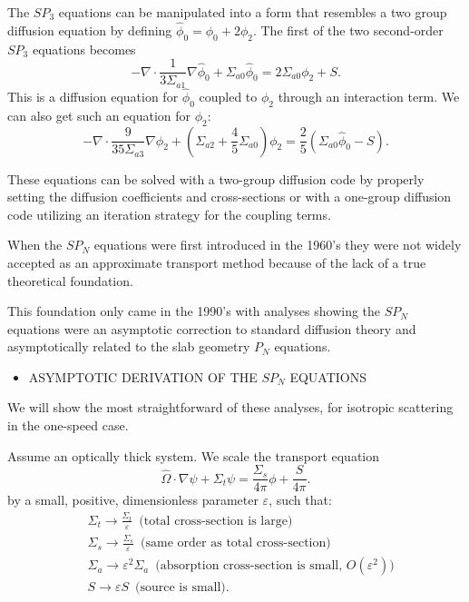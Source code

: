 \documentclass[12pt]{article}
\newcommand{\omvec}{\ensuremath{\hat{\Omega}}}
\newcommand{\ep}{\ensuremath{\varepsilon}}
\begin{document}
\begin{itemize}
The $SP_3$ equations can be manipulated into a form that resembles
a two group diffusion equation by defining $\hat\phi_0 = \phi_0+2\phi_2$. The first of the two second-order $SP_3$ equations becomes
\[
-\nabla\cdot\frac{1}{3\Sigma_{a1}}\nabla\hat\phi_0 + \Sigma_{a0}\hat\phi_0 = 2\Sigma_{a0}\phi_2+S.
\]
This is a diffusion equation for $\hat\phi_0$ coupled to $\phi_2$ through an interaction term. We can also get such an equation for $\phi_2$:
\[
-\nabla\cdot\frac{9}{35\Sigma_{a3}}\nabla\phi_2+\left(\Sigma_{a2}+\frac{4}{5}\Sigma_{a0}\right)\phi_2 = \frac{2}{5}(\Sigma_{a0}\hat\phi_0-S).
\]

These equations can be solved with a two-group diffusion code
by properly setting the diffusion coefficients and cross-sections or
with a one-group diffusion code utilizing an iteration strategy for
the coupling terms.
\end{itemize}

When the $SP_N$ equations were first introduced in the 1960's they were not widely accepted as an approximate
transport method because of the lack of a true theoretical
foundation.

This foundation only came in the 1990's with analyses showing the $SP_N$ equations were an asymptotic correction to standard diffusion theory
and asymptotically related to the slab geometry $P_N$ equations.

\begin{itemize}
\item ASYMPTOTIC DERIVATION OF THE $SP_N$ EQUATIONS
\end{itemize}
We will show the most straightforward of these analyses, for isotropic scattering in the one-speed case.

Assume an optically thick system. We scale the transport equation
\[
\omvec\cdot\nabla\psi +\Sigma_t\psi=\frac{\Sigma_s}{4\pi}\phi + \frac{S}{4\pi}.
\]
by
a small, positive, dimensionless parameter $\ep$, such that:
\[
\begin{split}
&\Sigma_t \rightarrow \frac{\Sigma_t}{\ep} \,\,\, \text{(total cross-section is large)}\\
&\Sigma_s \rightarrow \frac{\Sigma_s}{\ep} \,\,\, \text{(same order as total cross-section)}\\
&\Sigma_a \rightarrow \ep^2\Sigma_a \,\,\, \text{(absorption cross-section is small, $O(\ep^2)$)}\\
& S \rightarrow \ep S \,\,\, \text{(source is small)}.
\end{split}
\]
\end{document}
